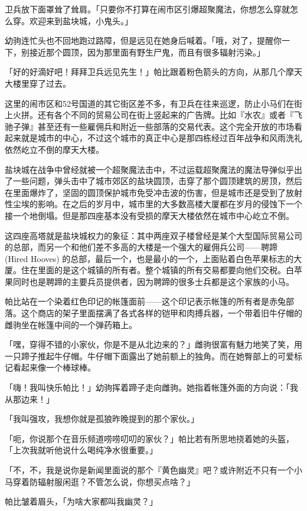 卫兵放下面罩耸了耸肩。「只要你不打算在闹市区引爆超聚魔法，你想怎么穿就怎么穿。欢迎来到盐块城，小鬼头。」

幼驹连忙头也不回地跑过路障，但是远见在她身后喊着。「哦，对了，提醒你一下，别接近那个圆顶，因为那里面有野生尸鬼，而且有很多辐射污染。」

「好的好滴好吧！拜拜卫兵远见先生！」帕比跟着粉色箭头的方向，从那几个摩天大楼里穿了过去。

这里的闹市区和52号国道的其它街区差不多，有卫兵在往来巡逻，防止小马们在街上火拼。还有各个不同的贸易公司在街上竖起来的广告牌。比如『水农』或者『飞驰子弹』甚至还有一些雇佣兵和附近一些部落的交易代表。这个完全开放的市场看起来就是城市的中心，不过这个城市的真正中心是那四栋经过百年战争和风雨洗礼依然屹立不倒的摩天大楼。

盐块城在战争中曾经就被一个超聚魔法击中，不过运载超聚魔法的魔法导弹似乎出了一些问题，弹头击中了城市郊区的盐块圆顶，击穿了那个圆顶建筑的房顶，然后在里面爆炸了，坚固的圆顶保护城市免受冲击波的伤害，但是城市还是受到了放射性尘埃的影响。在之后的岁月中，城市里的大多数高楼大厦都在岁月的侵蚀下一个接一个地倒塌。但是那四座基本没有受损的摩天大楼依然在城市中心屹立不倒。

这四座高塔就是盐块城权力的象征：其中两座双子楼曾经是某个大型国际贸易公司的总部，而另一个和他们差不多高的大楼是一个强大的雇佣兵公司——聘蹄 (Hired Hooves) 的总部，最后一个，也是最小的一个，上面贴着白色苹果标志的大厦。住在里面的是这个城镇的所有者。整个城镇的所有交易都要向他们交税。白苹果同时也是聘蹄的主要兵员提供者，因为聘蹄的很多士兵都是这个家族的小马。

帕比站在一个染着红色印记的帐篷面前——这个印记表示帐篷的所有者是赤兔部落。这个商店的架子里面摆满了各式各样的铠甲和肉搏兵器，一个带着旧牛仔帽的雌驹坐在帐篷中间的一个弹药箱上。

「嘿，穿得不错的小家伙，你是不是从北边来的？」雌驹很富有魅力地笑了笑，用一只蹄子推起牛仔帽。牛仔帽下面露出了她前额上的独角。而在她臀部上的可爱标记看起来像一个棒球棒。

「嗨！我叫快乐帕比！」幼驹挥着蹄子走向雌驹。她指着帐篷外面的方向说：「我从那边来！」

「我叫强攻，我想你就是孤狼昨晚提到的那个家伙。」

「呃，你说那个在音乐频道唠唠叨叨的家伙？」帕比若有所思地挠着她的头盔，「上次我就听他说什么喝纯净水很重要。」

「不，不，我是说你是新闻里面说的那个『黄色幽灵』吧？或许附近不只有一个小马穿着防辐射服闲逛？不管怎么说，你想买点啥？」

帕比皱着眉头，「为啥大家都叫我幽灵？」

